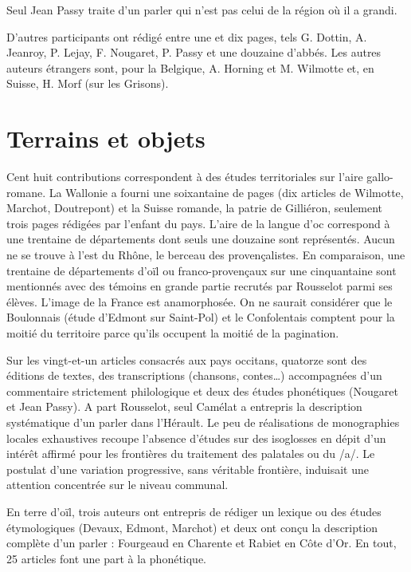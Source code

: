 \documentclass[output=paper]{langsci/langscibook}
\begin{document}
Seul Jean Passy traite d’un parler qui n’est pas celui de la région où il a grandi.

D’autres participants ont rédigé entre une et dix pages, tels G. Dottin, A. Jeanroy, P. Lejay, F. Nougaret, P. Passy et une douzaine d’abbés. Les autres auteurs étrangers sont, pour la Belgique, A. Horning et M. Wilmotte et, en Suisse, H. Morf (sur les Grisons).

\section{Terrains et objets}

Cent huit contributions correspondent à des études territoriales sur l’aire gallo-romane. La Wallonie a fourni une soixantaine de pages (dix articles de Wilmotte, Marchot, Doutrepont) et la Suisse romande, la patrie de Gilliéron, seulement trois pages rédigées par l’enfant du pays. L’aire de la langue d’oc correspond à une trentaine de départements dont seuls une douzaine sont représentés. Aucun ne se trouve à l’est du Rhône, le berceau des provençalistes. En comparaison, une trentaine de départements d’oïl ou franco-provençaux sur une cinquantaine sont mentionnés avec des témoins en grande partie recrutés par Rousselot parmi ses élèves. L’image de la France est anamorphosée. On ne saurait considérer que le Boulonnais (étude d’Edmont sur Saint-Pol) et le Confolentais comptent pour la moitié du territoire parce qu’ils occupent la moitié de la pagination. 

Sur les vingt-et-un articles consacrés aux pays occitans, quatorze sont des éditions de textes, des transcriptions (chansons, contes…) accompagnées d’un commentaire strictement philologique et deux des études phonétiques (Nougaret et Jean Passy). A part Rousselot, seul Camélat a entrepris la description systématique d’un parler dans l’Hérault. Le peu de réalisations de monographies locales exhaustives recoupe l’absence d’études sur des isoglosses en dépit d’un intérêt affirmé pour les frontières du traitement des palatales ou du /a/. Le postulat d’une variation progressive, sans véritable frontière, induisait une attention concentrée sur le niveau communal. 

En terre d’oïl, trois auteurs ont entrepris de rédiger un lexique ou des études étymologiques (Devaux, Edmont, Marchot) et deux ont conçu la description complète d’un parler : Fourgeaud en Charente et Rabiet en Côte d’Or. En tout, 25 articles font une part à la phonétique.
\end{document}
